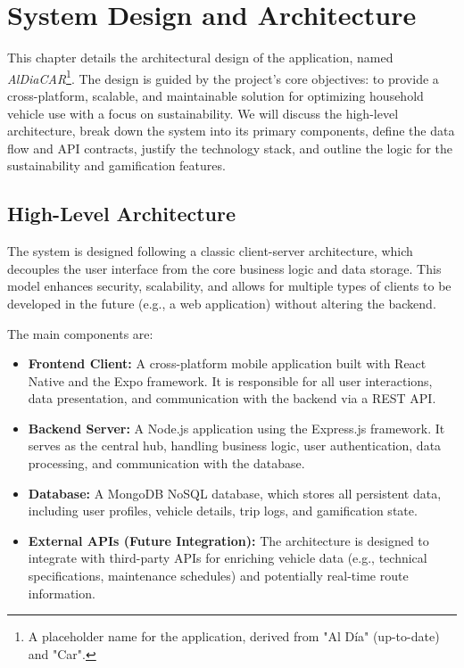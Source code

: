 \chapter{System Design and Architecture}

This chapter details the architectural design of the application, named \textit{AlDiaCAR}\footnote{A placeholder name for the application, derived from "Al Día" (up-to-date) and "Car".}. The design is guided by the project's core objectives: to provide a cross-platform, scalable, and maintainable solution for optimizing household vehicle use with a focus on sustainability. We will discuss the high-level architecture, break down the system into its primary components, define the data flow and API contracts, justify the technology stack, and outline the logic for the sustainability and gamification features.

\section{High-Level Architecture}

The system is designed following a classic client-server architecture, which decouples the user interface from the core business logic and data storage. This model enhances security, scalability, and allows for multiple types of clients to be developed in the future (e.g., a web application) without altering the backend.

The main components are:
\begin{itemize}
    \item \textbf{Frontend Client:} A cross-platform mobile application built with React Native and the Expo framework. It is responsible for all user interactions, data presentation, and communication with the backend via a REST API.
    \item \textbf{Backend Server:} A Node.js application using the Express.js framework. It serves as the central hub, handling business logic, user authentication, data processing, and communication with the database.
    \item \textbf{Database:} A MongoDB NoSQL database, which stores all persistent data, including user profiles, vehicle details, trip logs, and gamification state.
    \item \textbf{External APIs (Future Integration):} The architecture is designed to integrate with third-party APIs for enriching vehicle data (e.g., technical specifications, maintenance schedules) and potentially real-time route information.
\end{itemize}

